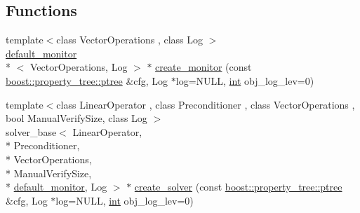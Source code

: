 \subsection*{Functions}
\begin{DoxyCompactItemize}
\item 
{\footnotesize template$<$class Vector\-Operations , class Log $>$ }\\\hyperlink{classnumerical__algos_1_1lin__solvers_1_1default__monitor}{default\-\_\-monitor}\\*
$<$ Vector\-Operations, Log $>$ $\ast$ \hyperlink{namespacenumerical__algos_1_1lin__solvers_a2a4b822ee82c023f108f2040a25b8163}{create\-\_\-monitor} (const \hyperlink{namespaceboost_1_1property__tree_aed170f35c6e34bdf310d34c11915b136}{boost\-::property\-\_\-tree\-::ptree} \&cfg, Log $\ast$log=N\-U\-L\-L, \hyperlink{classint}{int} obj\-\_\-log\-\_\-lev=0)
\item 
{\footnotesize template$<$class Linear\-Operator , class Preconditioner , class Vector\-Operations , bool Manual\-Verify\-Size, class Log $>$ }\\solver\-\_\-base$<$ Linear\-Operator, \\*
Preconditioner, \\*
Vector\-Operations, \\*
Manual\-Verify\-Size, \\*
\hyperlink{classnumerical__algos_1_1lin__solvers_1_1default__monitor}{default\-\_\-monitor}, Log $>$ $\ast$ \hyperlink{namespacenumerical__algos_1_1lin__solvers_a711dd4431c7634ce1823a19873764ffd}{create\-\_\-solver} (const \hyperlink{namespaceboost_1_1property__tree_aed170f35c6e34bdf310d34c11915b136}{boost\-::property\-\_\-tree\-::ptree} \&cfg, Log $\ast$log=N\-U\-L\-L, \hyperlink{classint}{int} obj\-\_\-log\-\_\-lev=0)
\end{DoxyCompactItemize}


